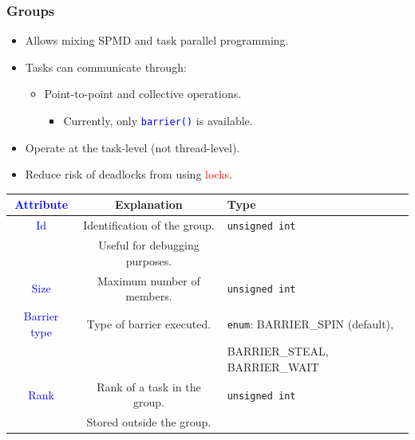\documentclass{beamer}
\newcommand{\code}[1]{\lstinline[basicstyle=\sffamily]{#1}}
\newcommand{\func}[1]{\lstinline[basicstyle=\sffamily]{#1()}}
\newcommand{\tablefont}{\fontsize{8}{13}\selectfont}
\begin{document}
\begin{frame}
\frametitle{Groups}
\begin{itemize}
\item Allows mixing SPMD and task parallel programming.
\item Tasks can communicate through:
  \begin{itemize}
  \item Point-to-point and collective operations.  
    \begin{itemize}
    \item Currently, only \textcolor{blue}{\func{barrier}} is available.
    \end{itemize}
  \end{itemize}
\item Operate at the task-level (not thread-level).
\item Reduce risk of deadlocks from using \textcolor{red}{locks}.
\end{itemize}
\begin{center}
\tablefont
\begin{tabular}{|c|c|l|}
\hline
\textcolor{blue}{Attribute} & Explanation & Type \\
\hline
\textcolor{blue}{Id} & Identification of the group. & \code{unsigned int} \\
          & Useful for debugging purposes. & \\
\hline
\textcolor{blue}{Size} & Maximum number of members. & \code{unsigned int} \\
\hline
\textcolor{blue}{Barrier type} & Type of barrier executed. & \code{enum}: BARRIER\_SPIN (default), \\
                    &                           & BARRIER\_STEAL, BARRIER\_WAIT\\
\hline
\textcolor{blue}{Rank} & Rank of a task in the group. & \code{unsigned int} \\
            & Stored outside the group. & \\
\hline
\end{tabular}
\normalsize
\end{center}
\end{frame}
\end{document}
